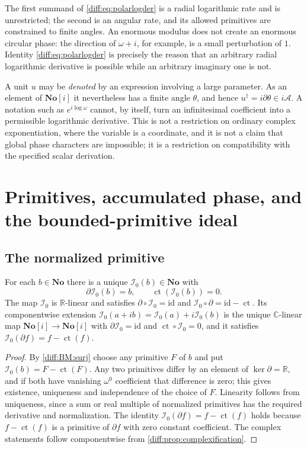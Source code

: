 \documentclass[11pt,letterpaper]{article}
\numberwithin{equation}{section}
\theoremstyle{definition}
\theoremstyle{remark}
\newcommand{\No}{\mathbf{No}}
\newcommand{\SC}{\mathbf{No}[i]}
\newcommand{\R}{\mathbb R}
\newcommand{\C}{\mathbb C}
\newcommand{\der}{\partial}
\newcommand{\Acl}{\mathcal A}
\newcommand{\Izero}{\mathcal I_{0}}
\newcommand{\ct}{\operatorname{ct}}
\newcommand{\Ker}{\operatorname{ker}}
\begin{document}
The first summand of \cref{diff:eq:polarlogder} is a radial logarithmic rate
and is unrestricted; the second is an angular rate, and its allowed
primitives are constrained to finite angles. An enormous modulus does not
create an enormous circular phase: the direction of $\omega+i$, for example, is
a small perturbation of $1$. Identity \cref{diff:eq:polarlogder} is precisely
the reason that an arbitrary radial logarithmic derivative is possible while an
arbitrary imaginary one is not.

\begin{warning}
\label{diff:warn:nohiding}
A unit $u$ may be \emph{denoted} by an expression involving a large parameter.
As an element of $\SC$ it nevertheless has a finite angle $\theta$, and hence
$u^{\dagger}=i\der\theta\in i\Acl$. A notation such as $e^{i\log\omega}$
cannot, by itself, turn an infinitesimal coefficient into a permissible
logarithmic derivative. This is not a restriction on ordinary complex
exponentiation, where the variable is a coordinate, and it is not a claim that
global phase characters are impossible; it is a restriction on compatibility
with the specified scalar derivation.
\end{warning}

\section{Primitives, accumulated phase, and the bounded-primitive ideal}
\label{diff:sec:primitives}

\subsection{The normalized primitive}
\label{diff:sub:normprimitive}

\begin{proposition}
\label{diff:prop:normprimitive}
For each $b\in\No$ there is a unique $\Izero(b)\in\No$ with
\[
 \der\Izero(b)=b,\qquad \ct(\Izero(b))=0 .
\]
The map $\Izero$ is $\R$-linear and satisfies
$\der\circ\Izero=\mathrm{id}$ and $\Izero\circ\der=\mathrm{id}-\ct$. Its
componentwise extension $\Izero(a+ib)=\Izero(a)+i\Izero(b)$ is the unique
$\C$-linear map $\SC\to\SC$ with $\der\Izero=\mathrm{id}$ and
$\ct\circ\Izero=0$, and it satisfies
$\Izero(\der f)=f-\ct(f)$.
\end{proposition}
\begin{proof}
By \ref{diff:BM:surj} choose any primitive $F$ of $b$ and put
$\Izero(b)=F-\ct(F)$. Any two primitives differ by an element of
$\Ker\der=\R$, and if both have vanishing $\omega^{0}$ coefficient that
difference is zero; this gives existence, uniqueness and independence of the
choice of $F$. Linearity follows from uniqueness, since a sum or real multiple
of normalized primitives has the required derivative and normalization. The
identity $\Izero(\der f)=f-\ct(f)$ holds because $f-\ct(f)$ is a primitive of
$\der f$ with zero constant coefficient. The complex statements follow
componentwise from \cref{diff:prop:complexification}.
\end{proof}
\end{document}

